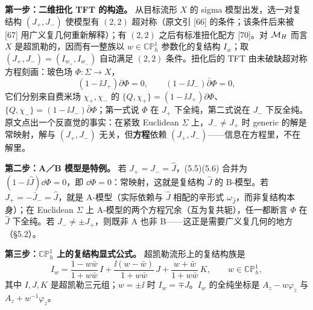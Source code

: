 \textbf{第一步：二维扭化 TFT 的构造。} 从目标流形 $X$ 的 sigma 模型出发，选一对复结构 $(J_+,J_-)$ 使模型有 $(2,2)$ 超对称（原文引 [66] 的条件；该条件后来被 [67] 用广义复几何重新解释）；有 $(2,2)$ 之后有标准扭化配方 [70]\pA{}。对 $\mathcal{M}_H$ 而言 $X$ 是超凯勒的，因而有一整族以 $w\in\mathbb{CP}^1_h$ 参数化的复结构 $I_w$；取 $(J_+,J_-)=(I_{w_+},I_{w_-})$ 自动满足 $(2,2)$ 条件\pA{}。扭化后的 TFT 由未破缺超对称方程刻画：玻色场 $\Phi:\Sigma\to X$，
\begin{equation}
(1-\ii J_+)\partial\Phi=0,
\qquad
(1-\ii J_-)\bar\partial\Phi=0,
\label{eq:twodim}
\end{equation}
它们分别来自费米场 $\chi_+,\chi_-$ 的 $\{Q,\chi_+\}=(1-\ii J_+)\partial\Phi$、$\{Q,\chi_-\}=(1-\ii J_-)\bar\partial\Phi$；第一式说 $\Phi$ 在 $J_+$ 下全纯，第二式说在 $J_-$ 下反全纯\pA{}。原文点出一个反直觉的事实：在紧致 Euclidean $\Sigma$ 上，$J_-\ne J_+$ 时 generic 的解是常映射，解与 $(J_+,J_-)$ 无关，但\textbf{方程}依赖 $(J_+,J_-)$——信息在方程里，不在解里\pA{}。

\textbf{第二步：A／B 模型是特例。} 若 $J_+=J_-=\hat J$，(5.5)(5.6) 合并为 $(1-\ii\hat J)\dd\Phi=0$，即 $\dd\Phi=0$：常映射，这就是复结构 $\hat J$ 的 B-模型。若 $J_+=-\bar J_-=\hat J$，就是 A-模型（实际依赖与 $\hat J$ 相配的辛形式 $\omega_{\hat J}$，而非复结构本身）；在 Euclidean $\Sigma$ 上 A-模型的两个方程冗余（互为复共轭），任一都断言 $\Phi$ 在 $\hat J$ 下全纯\pA{}。若 $J_-\ne\pm J_+$，则既非 A 也非 B——这正是需要广义复几何的地方（§5.2）。

\textbf{第三步：$\mathbb{CP}^1_h$ 上的复结构显式公式。} 超凯勒流形上的复结构族是\pA{}
\begin{equation}
I_w=\frac{1-w\bar w}{1+w\bar w}\,I+\frac{\ii(w-\bar w)}{1+w\bar w}\,J+\frac{w+\bar w}{1+w\bar w}\,K,
\qquad w\in\mathbb{CP}^1_h,
\label{eq:Iw-twist}
\end{equation}
其中 $I,J,K$ 是超凯勒三元组；$w=\pm\ii$ 时 $I_w=\mp J$。$I_w$ 的全纯坐标是 $A_z-w\varphi_z$ 与 $A_z+w^{-1}\varphi_z$\pA{}。

